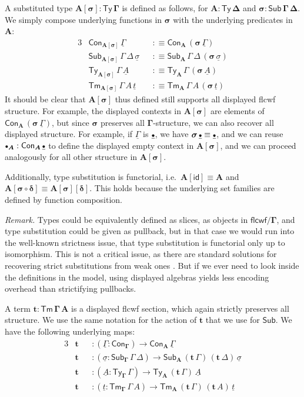 \documentclass[12pt,a4paper,twoside,openany]{book}
\theoremstyle{remark}
\theoremstyle{definition}
\theoremstyle{theorem}
\newcommand{\ms}[1]{\mathsf{#1}}
\newcommand{\bs}[1]{\boldsymbol{#1}}
\newcommand{\id}{\mathsf{id}}
\newcommand{\Con}{\mathsf{Con}}
\newcommand{\Sub}{\mathsf{Sub}}
\newcommand{\Tm}{\mathsf{Tm}}
\newcommand{\Ty}{\mathsf{Ty}}
\newcommand{\emptycon}{\scaleobj{.75}\bullet}
\newcommand{\bSub}{\bs{\Sub}}
\newcommand{\bGamma}{\bs{\Gamma}}
\newcommand{\bsigma}{\bs{\sigma}}
\newcommand{\bt}{\bs{t}}
\newcommand{\bA}{\bs{A}}
\newcommand{\ul}[1]{\underline{#1}}
\newcommand{\ulGamma}{\ul{\Gamma}}
\newcommand{\ulsigma}{\ul{\sigma}}
\newcommand{\ult}{\ul{t}}
\newcommand{\ulA}{\ul{A}}
\newcommand{\defn}{:\equiv}
\begin{document}
A substituted type $\bs{A[\sigma] : \Ty\,\Gamma}$ is defined as follows, for
$\bs{A : \Ty\,\Delta}$ and $\bs{\sigma : \Sub\,\Gamma\,\Delta}$. We simply compose
underlying functions in $\bsigma$ with the underlying predicates in $\bA$:
\begin{alignat*}{3}
  & \Con_{\bs{A[\sigma]}}\,\ulGamma && \defn \Con_{\bA}\,(\bsigma\,\ulGamma)\\
  & \Sub_{\bs{A[\sigma]}}\,\Gamma\,\Delta\,\ulsigma && \defn
    \Sub_{\bA}\,\Gamma\,\Delta\,(\bsigma\,\ulsigma)\\
  & \Ty_{\bs{A[\sigma]}}\,\Gamma\,\ulA && \defn
      \Ty_{\bA}\,\Gamma\,(\bsigma\,\ulA)\\
  & \Tm_{\bs{A[\sigma]}}\,\Gamma\,A\,\ult && \defn
      \Tm_{\bA}\,\Gamma\,A\,(\bsigma\,\ult)
\end{alignat*}
It should be clear that $\bs{A[\sigma]}$ thus defined still supports all
displayed flcwf structure. For example, the displayed contexts in
$\bs{A[\sigma]}$ are elements of $\Con_{\bA}\,(\bsigma\,\ulGamma)$, but since
$\bsigma$ preserves all $\bGamma$-structure, we can also recover all displayed
structure. For example, if $\ulGamma$ is $\ul{\emptycon}$, we have
$\bsigma\,\ul{\emptycon} \equiv \ul{\emptycon}$, and we can reuse
$\emptycon_{\bA} : \Con_{\bA}\,\ul{\emptycon}$ to define the displayed empty
context in $\bs{A[\sigma]}$, and we can proceed analogously for all other
structure in $\bs{A[\sigma]}$.

Additionally, type substitution is functorial, i.e.\ $\bs{A[\id]} \equiv \bA$
and $\bs{A[\sigma \circ \delta]} \equiv \bs{A[\sigma][\delta]}$. This holds
because the underlying set families are defined by function composition.

\emph{Remark.} Types could be equivalently defined as slices, as objects in
$\bs{\ms{flcwf}}/\bGamma$, and type substitution could be given as pullback, but in
that case we would run into the well-known strictness issue, that type
substitution is functorial only up to isomorphism. This is not a critical issue,
as there are standard solutions for recovering strict substitutions from weak
ones \cite{kapulkin12simplicial,local-univ,clairambault2014biequivalence}. But
if we ever need to look inside the definitions in the model, using displayed
algebras yields less encoding overhead than strictifying pullbacks.

A term $\bs{t : \Tm\,\Gamma\,A}$ is a displayed flcwf section, which again
strictly preserves all structure. We use the same notation for the action of
$\bt$ that we use for $\bSub$. We have the following underlying maps:
\begin{alignat*}{3}
  & \bt &&: (\ulGamma : \Con_{\bGamma}) \to \Con_{\bA}\,\ulGamma \\
  & \bt &&: (\ulsigma : \Sub_{\bGamma}\,\Gamma\,\Delta) \to
             \Sub_{\bA}\,(\bt\,\Gamma)\,(\bt\,\Delta)\,\ulsigma\\
  & \bt &&: (\ulA : \Ty_{\bGamma}\,\Gamma) \to \Ty_{\bA}\,(\bt\,\Gamma)\,\ulA\\
  & \bt &&: (\ult : \Tm_{\bGamma}\,\Gamma\,A) \to \Tm_{\bA}\,(\bt\,\Gamma)\,(\bt\,A)\,\ult
\end{alignat*}
\end{document}
